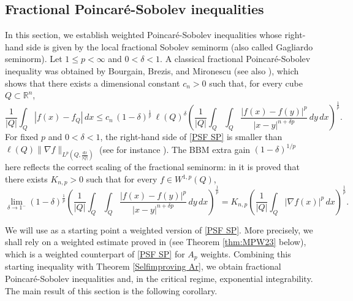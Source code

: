 \documentclass[reqno, 10pt, oneside]{amsart}
\numberwithin{equation}{section}
\numberwithin{theorem}{section}
\newcommand{\1}{{\rm 1\hspace*{-0.4ex}%
\rule{0.1ex}{1.52ex}\hspace*{0.2ex}}}
\begin{document}
	


\subsection{Fractional Poincaré-Sobolev inequalities}\label{Section FPS}

In this section, we establish weighted Poincaré-Sobolev inequalities whose right-hand side is given by the local fractional Sobolev seminorm (also called Gagliardo seminorm). Let $1\le p<\infty$ and $0<\delta<1$. A classical fractional Poincaré-Sobolev inequality was obtained by Bourgain, Brezis, and Mironescu \cite{BBM1} (see also \cite{BBM2}), which shows that there exists a dimensional constant $c_n>0$ such that, for every cube $Q\subset\mathbb{R}^n$,
\begin{equation}\label{PSF SP}
	\frac{1}{|Q|}\int_Q |f(x)-f_Q|\,dx \le c_n\,(1-\delta)^{\frac{1}{p}}\,\ell(Q)^\delta \left(\frac{1}{|Q|}\int_Q\int_Q \frac{|f(x)-f(y)|^p}{|x-y|^{n+\delta p}}\,dy\,dx\right)^{\frac{1}{p}}.
\end{equation}
For fixed $p$ and $0<\delta<1$, the right-hand side of \eqref{PSF SP} is smaller than $\ell(Q) \|\nabla f\|_{L^p(Q, \frac{dx}{|Q|})}$ (see for instance \cite{Inverse}). The BBM extra gain $(1-\delta)^{1/p}$ here reflects the correct scaling of the fractional seminorm: in
\cite{BBM2} it is proved that there exists $K_{n,p}>0$ such that for every $f\in W^{1,p}(Q)$,
\begin{equation*}
	\lim_{\delta\to 1^-} (1-\delta)^{\frac{1}{p}} \left(\frac{1}{|Q|}\int_Q\int_Q \frac{|f(x)-f(y)|^p}{|x-y|^{n+\delta p}}\,dy\,dx\right)^{\frac{1}{p}} = K_{n,p}\left(\frac{1}{|Q|}\int_Q |\nabla f(x)|^p\,dx\right)^{\frac{1}{p}}.
\end{equation*}

We will use as a starting point a weighted version of \eqref{PSF SP}. More
precisely, we shall rely on a weighted estimate proved in \cite{MPW} (see
Theorem \ref{thm:MPW23} below), which is a weighted counterpart of \eqref{PSF SP} for $A_p$ weights. Combining this starting inequality with Theorem \ref{Selfimproving Ar}, we obtain fractional Poincaré-Sobolev inequalities and, in the critical regime, exponential integrability. The main result of this section is the following
corollary.
\end{document}
